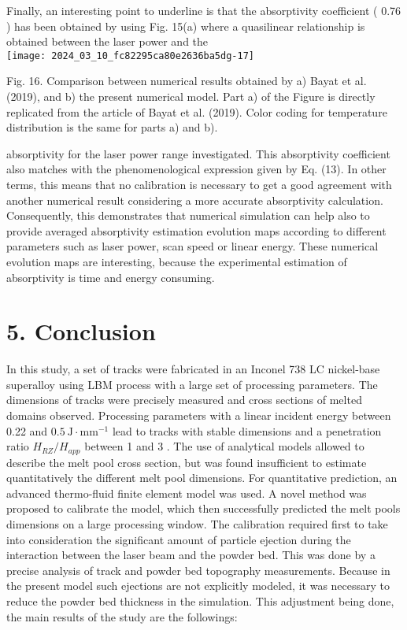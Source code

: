 \documentclass[10pt]{article}
\begin{document}
Finally, an interesting point to underline is that the absorptivity coefficient ( 0.76 ) has been obtained by using Fig. 15(a) where a quasilinear relationship is obtained between the laser power and the\\
\texttt{[image: 2024\_03\_10\_fc82295ca80e2636ba5dg-17]}

Fig. 16. Comparison between numerical results obtained by a) Bayat et al. (2019), and b) the present numerical model. Part a) of the Figure is directly replicated from the article of Bayat et al. (2019). Color coding for temperature distribution is the same for parts a) and b).

absorptivity for the laser power range investigated. This absorptivity coefficient also matches with the phenomenological expression given by Eq. (13). In other terms, this means that no calibration is necessary to get a good agreement with another numerical result considering a more accurate absorptivity calculation. Consequently, this demonstrates that numerical simulation can help also to provide averaged absorptivity estimation evolution maps according to different parameters such as laser power, scan speed or linear energy. These numerical evolution maps are interesting, because the experimental estimation of absorptivity is time and energy consuming.

\section*{5. Conclusion}
In this study, a set of tracks were fabricated in an Inconel 738 LC nickel-base superalloy using LBM process with a large set of processing parameters. The dimensions of tracks were precisely measured and cross sections of melted domains observed. Processing parameters with a linear incident energy between 0.22 and $0.5 \mathrm{~J} \cdot \mathrm{mm}^{-1}$ lead to tracks with stable dimensions and a penetration ratio $H_{R Z} / H_{a p p}$ between 1 and 3 . The use of analytical models allowed to describe the melt pool cross section, but was found insufficient to estimate quantitatively the different melt pool dimensions. For quantitative prediction, an advanced thermo-fluid finite element model was used. A novel method was proposed to calibrate the model, which then successfully predicted the melt pools dimensions on a large processing window. The calibration required first to take into consideration the significant amount of particle ejection during the interaction between the laser beam and the powder bed. This was done by a precise analysis of track and powder bed topography measurements. Because in the present model such ejections are not explicitly modeled, it was necessary to reduce the powder bed thickness in the simulation. This adjustment being done, the main results of the study are the followings:
\end{document}
